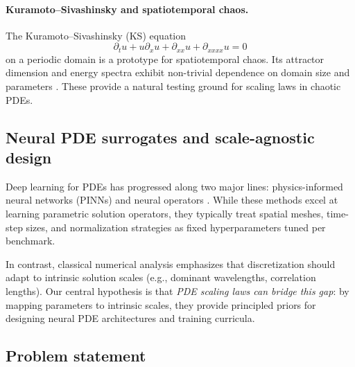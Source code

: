 \documentclass{article}
\theoremstyle{plain}
\theoremstyle{definition}
\theoremstyle{remark}
\begin{document}
\paragraph{Kuramoto--Sivashinsky and spatiotemporal chaos.}
The Kuramoto--Sivashinsky (KS) equation
\begin{equation}
    \partial_t u + u \partial_x u + \partial_{xx}u + \partial_{xxxx}u = 0
\end{equation}
on a periodic domain is a prototype for spatiotemporal chaos. Its attractor dimension and energy spectra exhibit non-trivial dependence on domain size and parameters \citep{Jolly2000InertialKS,WittenbergHolmes1999KSScale}. These provide a natural testing ground for scaling laws in chaotic PDEs.

\subsection{Neural PDE surrogates and scale-agnostic design}

Deep learning for PDEs has progressed along two major lines: physics-informed neural networks (PINNs) \citep{Sirignano2018DGM,Raissi2019PINN,Cai2021PINNFluidReview} and neural operators \citep{Li2021FNO,Kovachki2021NeuralOperator,Lu2021DeepONet,Tripura2022WaveletNO,Cao2024LaplaceNO,Xiong2024KoopmanNO}. While these methods excel at learning parametric solution operators, they typically treat spatial meshes, time-step sizes, and normalization strategies as fixed hyperparameters tuned per benchmark.

In contrast, classical numerical analysis emphasizes that discretization should adapt to intrinsic solution scales (e.g., dominant wavelengths, correlation lengths). Our central hypothesis is that \emph{PDE scaling laws can bridge this gap}: by mapping parameters to intrinsic scales, they provide principled priors for designing neural PDE architectures and training curricula.

\subsection{Problem statement}
\end{document}
